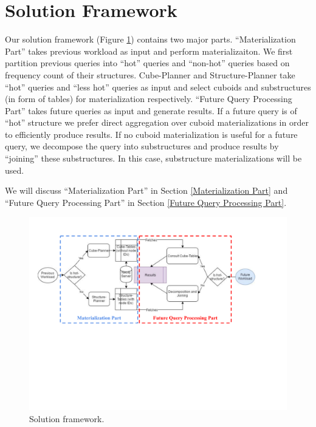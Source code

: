 




\section{Solution Framework}

Our solution framework (Figure \ref{Solution framework}) contains two major parts. ``Materialization Part'' takes previous workload as input and perform materializaiton. We first partition previous queries into ``hot'' queries and ``non-hot'' queries based on frequency count of their structures. Cube-Planner and Structure-Planner take ``hot'' queries and ``less hot'' queries as input and select cuboids and substructures (in form of tables) for materialization respectively. ``Future Query Processing Part'' takes future queries as input and generate results. If a future query is of ``hot'' structure we prefer direct aggregation over cuboid materializations in order to efficiently produce results. If no cuboid materialization is useful for a future query, we decompose the query into substructures and produce results by ``joining'' these substructures. In this case, substructure materializations will be used. 

We will discuss ``Materialization Part'' in Section \ref{Materialization Part} and ``Future Query Processing Part'' in Section \ref{Future Query Processing Part}.

\begin {figure}[H]
\centering
\includegraphics[scale=0.8]{pic/41.pdf}
\caption{Solution framework.}
\label{Solution framework}
\end{figure}



